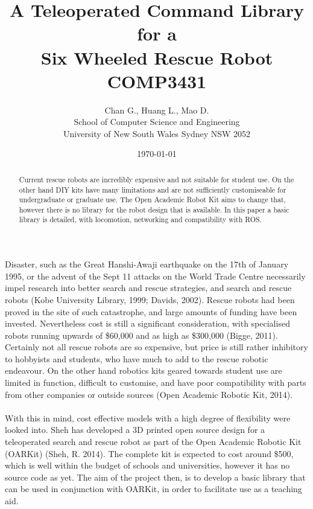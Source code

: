 \documentclass[]{article}
\title{A Teleoperated Command Library for a \\ Six Wheeled Rescue Robot \\ COMP3431}
\author{Chan G., Huang L., Mao D.\\
\small School of Computer Science and Engineering\\[-0.8ex]
\small University of New South Wales Sydney NSW 2052}
\date{\today}
\begin{document}
\maketitle %

\begin{abstract}
Current rescue robots are incredibly expensive and not suitable for student use. On the other hand DIY kits have many limitations and are not sufficiently customiseable for undergraduate or graduate use. The Open Academic Robot Kit aims to change that, however there is no library for the robot design that is available. In this paper a basic library is detailed, with locomotion, networking and compatibility with ROS.
\end{abstract}

\section{}
Disaster, such as the Great Hanshi-Awaji earthquake on the 17th of January 1995, or the advent of the Sept 11 attacks on the World Trade Centre necessarily impel research into better search and rescue strategies, and search and rescue robots (Kobe University Library, 1999; Davids, 2002). Rescue robots had been proved in the site of such catastrophe, and large amounts of funding have been invested. Nevertheless cost is still a significant consideration, with specialised robots running upwards of \$60,000 and as high as \$300,000 (Bigge, 2011). Certainly not all rescue robots are so expensive, but price is still rather inhibitory to hobbyists and students, who have much to add to the rescue robotic endeavour. On the other hand robotics kits geared towards student use are limited in function, difficult to customise, and have poor compatibility with parts from other companies or outside sources (Open Academic Robotic Kit, 2014).
\\
\\
With this in mind, cost effective models with a high degree of flexibility were looked into. Sheh has developed a 3D printed open source design for a teleoperated search and rescue robot as part of the Open Academic Robotic Kit (OARKit) (Sheh, R. 2014). The complete kit is expected to cost around \$500, which is well within the budget of schools and universities, however it has no source code as yet. The aim of the project then, is to develop a basic library that can be used in conjunction with OARKit, in order to facilitate use as a teaching aid.
\end{document}
